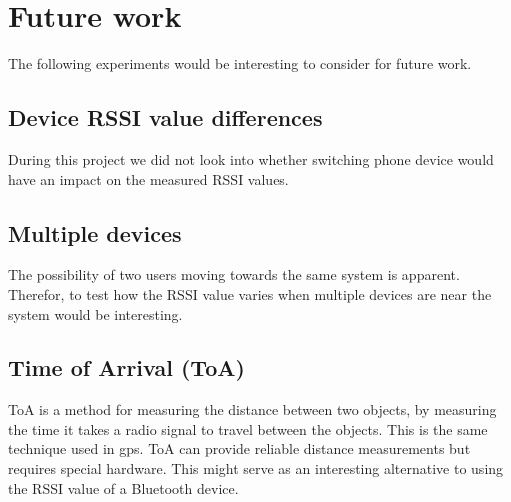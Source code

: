 \section{Future work}
The following experiments would be interesting to consider for future work.


\subsection{Device RSSI value differences}

During this project we did not look into whether switching phone device would have an impact on the measured RSSI values.


\subsection{Multiple devices}

The possibility of two users moving towards the same system is apparent. Therefor, to test how the RSSI value varies when multiple devices are near the system would be interesting.


\subsection{Time of Arrival (ToA)}
ToA is a method for measuring the distance between two objects, by measuring the time it takes a radio signal to travel between the objects. This is the same technique used in gps. ToA can provide reliable distance measurements but requires special hardware. This might serve as an interesting alternative to using the RSSI value of a Bluetooth device.
